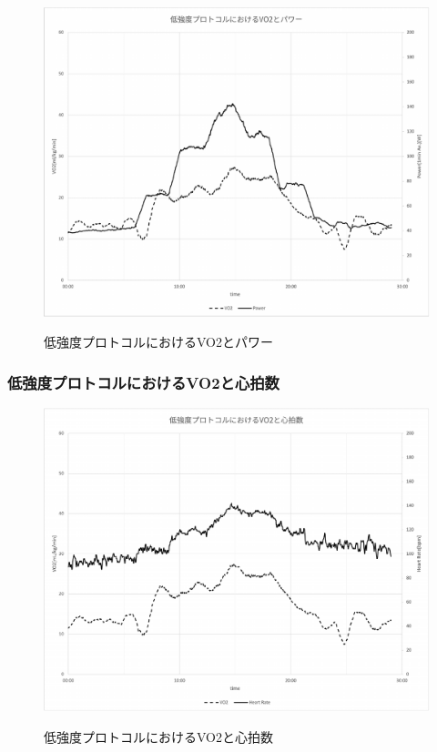 \begin{figure}[H]
  \begin{center}
    \label{fig:light_vo2_power}
    \includegraphics[width=12cm]{fig/light_vo2_power}
    \caption{低強度プロトコルにおけるVO2とパワー}
  \end{center}
\end{figure}

\subsubsection{低強度プロトコルにおけるVO2と心拍数}

\begin{figure}[H]
  \begin{center}
    \label{fig:light_vo2_hr}
    \includegraphics[width=12cm]{fig/light_vo2_hr}
    \caption{低強度プロトコルにおけるVO2と心拍数}
  \end{center}
\end{figure}


